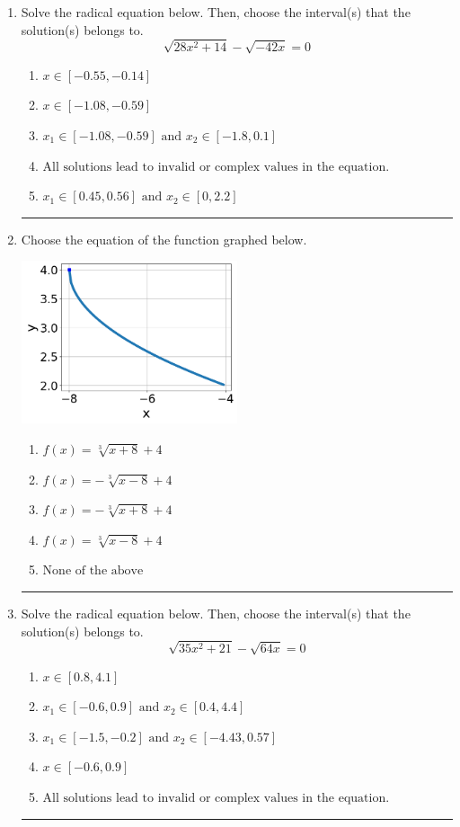 \documentclass[14pt]{extbook}
\newcommand{\litem}[1]{\item#1\hspace*{-1cm}\rule{\textwidth}{0.4pt}}
\begin{document}
\begin{enumerate}
\litem{
Solve the radical equation below. Then, choose the interval(s) that the solution(s) belongs to.\[ \sqrt{28 x^2 + 14} - \sqrt{-42 x} = 0 \]\begin{enumerate}[label=\Alph*.]
\item \( x \in [-0.55,-0.14] \)
\item \( x \in [-1.08,-0.59] \)
\item \( x_1 \in [-1.08, -0.59] \text{ and } x_2 \in [-1.8,0.1] \)
\item \( \text{All solutions lead to invalid or complex values in the equation.} \)
\item \( x_1 \in [0.45, 0.56] \text{ and } x_2 \in [0,2.2] \)

\end{enumerate} }
\litem{
Choose the equation of the function graphed below.
\begin{center}
    \includegraphics[width=0.5\textwidth]{../Figures/radicalGraphToEquationA.png}
\end{center}
\begin{enumerate}[label=\Alph*.]
\item \( f(x) = \sqrt[3]{x + 8} + 4 \)
\item \( f(x) = - \sqrt[3]{x - 8} + 4 \)
\item \( f(x) = - \sqrt[3]{x + 8} + 4 \)
\item \( f(x) = \sqrt[3]{x - 8} + 4 \)
\item \( \text{None of the above} \)

\end{enumerate} }
\litem{
Solve the radical equation below. Then, choose the interval(s) that the solution(s) belongs to.\[ \sqrt{35 x^2 + 21} - \sqrt{64 x} = 0 \]\begin{enumerate}[label=\Alph*.]
\item \( x \in [0.8,4.1] \)
\item \( x_1 \in [-0.6, 0.9] \text{ and } x_2 \in [0.4,4.4] \)
\item \( x_1 \in [-1.5, -0.2] \text{ and } x_2 \in [-4.43,0.57] \)
\item \( x \in [-0.6,0.9] \)
\item \( \text{All solutions lead to invalid or complex values in the equation.} \)


\end{enumerate}}
\end{enumerate}
\end{document}
